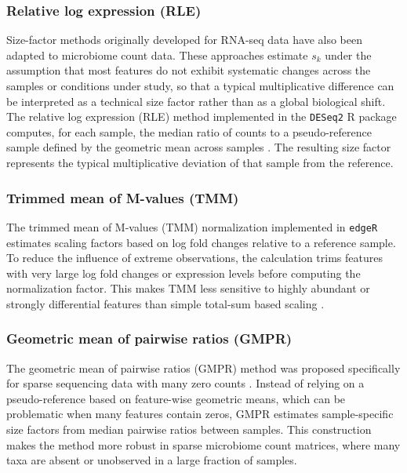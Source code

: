 \subsubsection*{Relative log expression (RLE)}

Size-factor methods originally developed for RNA-seq data have also been adapted to microbiome count data. These approaches estimate $s_k$ under the assumption that most features do not exhibit systematic changes across the samples or conditions under study, so that a typical multiplicative difference can be interpreted as a technical size factor rather than as a global biological shift. The relative log expression (RLE) method implemented in the \texttt{DESeq2} \textsf{R} package \citep{love2014moderated} computes, for each sample, the median ratio of counts to a pseudo-reference sample defined by the geometric mean across samples \citep{badri2020shrinkage}. The resulting size factor represents the typical multiplicative deviation of that sample from the reference.

\subsubsection*{Trimmed mean of M-values (TMM)}

The trimmed mean of M-values (TMM) normalization implemented in \texttt{edgeR} \citep{robinson2010edger,chen2025edger} estimates scaling factors based on log fold changes relative to a reference sample. To reduce the influence of extreme observations, the calculation trims features with very large log fold changes or expression levels before computing the normalization factor. This makes TMM less sensitive to highly abundant or strongly differential features than simple total-sum based scaling \citep{baruzzo2022beware}.

\subsubsection*{Geometric mean of pairwise ratios (GMPR)}

The geometric mean of pairwise ratios (GMPR) method was proposed specifically for sparse sequencing data with many zero counts \citep{chen2018gmpr}. Instead of relying on a pseudo-reference based on feature-wise geometric means, which can be problematic when many features contain zeros, GMPR estimates sample-specific size factors from median pairwise ratios between samples. This construction makes the method more robust in sparse microbiome count matrices, where many taxa are absent or unobserved in a large fraction of samples. 


